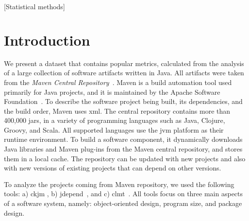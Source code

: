 \documentclass{sig-alternate}
\begin{document}
[Statistical methods]



\section{Introduction}
\label{sec:intro}



We present a dataset that contains popular metrics, calculated from the analysis of a large collection of software artifacts written in Java. All artifacts were taken from the {\it Maven Central Repository}~\cite{MAVEN}.
Maven is a build automation tool used primarily for Java projects, and it is maintained by the Apache Software Foundation~\cite{MAVEN}. To describe the software project being built, its dependencies, and the build order, Maven uses {\sc xml}. The central repository contains more than 400,000 {\sc jar}s, in a variety of programming languages such as Java, Clojure, Groovy, and Scala. All supported languages use the {\sc jvm} platform as their runtime environment.
To build a software component, it dynamically downloads Java libraries and Maven plug-ins from the Maven central repository, and stores them in a local cache. The repository can be updated with new projects and also with new versions of existing projects that can depend on other versions.

To analyze the projects coming from Maven repository, we used the following tools: a) {\sc ckjm} \cite{Spi05g}, b) {\sc jd}epend~\cite{JDEPEND}, and c) {\sc clmt}~\cite{SGKL09}. All tools focus on three main aspects of a software system, namely: object-oriented design, program size, and package design.
\end{document}
